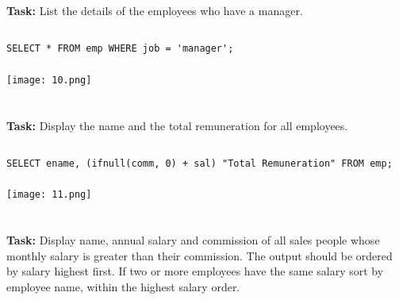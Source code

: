 \documentclass[12pt,a4paper]{article}
\begin{document}

\section{}
\textbf{Task:} List the details of the employees who have a manager.

\subsection{}
\begin{lstlisting}
SELECT * FROM emp WHERE job = 'manager';

\end{lstlisting}

\subsubsection{}
\begin{center}
    \texttt{[image: 10.png]}
\end{center}


\section{}
\textbf{Task:} Display the name and the total remuneration for all employees.

\subsection{}
\begin{lstlisting}
SELECT ename, (ifnull(comm, 0) + sal) "Total Remuneration" FROM emp;

\end{lstlisting}

\subsubsection{}
\begin{center}
    \texttt{[image: 11.png]}
\end{center}


\section{}
\textbf{Task:} Display name, annual salary and commission of all sales people
whose monthly salary is greater than their commission. The output
should be ordered by salary highest first. If two or more employees
have the same salary sort by employee name, within the highest
salary order.
\end{document}

